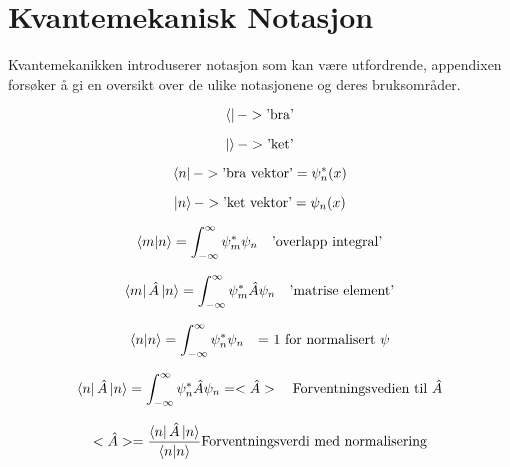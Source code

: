 \appendix

\section{Kvantemekanisk Notasjon}
\label{notasjon}

Kvantemekanikken introduserer notasjon som kan være utfordrende, appendixen forsøker å gi en oversikt over de ulike notasjonene og deres bruksområder.

\begin{equation*}
    \bra{} -> \text{'bra'}
\end{equation*}

\begin{equation*}
    \ket{} -> \text{'ket'}
\end{equation*}

\begin{equation*}
    \bra{n} -> \text{'bra vektor'} = \psi_n^*(x)
\end{equation*}

\begin{equation*}
    \ket{n} -> \text{'ket vektor'} = \psi_n(x)
\end{equation*}

\begin{equation*}
    \bra{m}\ket{n} = \int_{-\infty}^{\infty}\psi_m^*\psi_n \quad \text{'overlapp integral'}
\end{equation*}

\begin{equation*}
    \bra{m}\hat{A}\ket{n} = \int_{-\infty}^{\infty}\psi_m^*\hat{A}\psi_n \quad \text{'matrise element'}
\end{equation*}

\begin{equation*}
    \bra{n}\ket{n} = \int_{-\infty}^{\infty}\psi_n^*\psi_n \quad \text{= 1 for normalisert }\psi
\end{equation*}

\begin{equation*}
    \bra{n}\hat{A}\ket{n} = \int_{-\infty}^{\infty}\psi_n^*\hat{A}\psi_n = <\hat{A}> \quad \text{Forventningsvedien til }\hat{A}
\end{equation*}

\begin{equation*}
<\hat{A}> = \frac{\bra{n}\hat{A}\ket{n}}{\bra{n}\ket{n}} \text{Forventningsverdi med normalisering}
\end{equation*}


